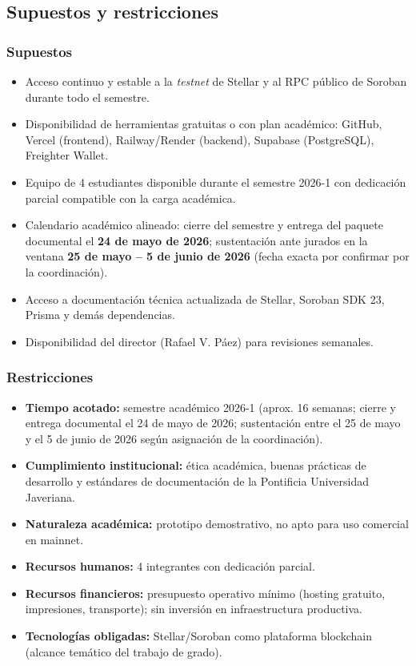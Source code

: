 \documentclass[12pt,oneside]{report}
\begin{document}
    \subsection{Supuestos y restricciones}
    \label{subsec:supuestos-restricciones}

      \subsubsection*{Supuestos}
      \begin{itemize}
        \item Acceso continuo y estable a la \textit{testnet} de Stellar y al RPC público de Soroban durante todo el semestre.
        \item Disponibilidad de herramientas gratuitas o con plan académico: GitHub, Vercel (frontend), Railway/Render (backend), Supabase (PostgreSQL), Freighter Wallet.
        \item Equipo de 4 estudiantes disponible durante el semestre 2026-1 con dedicación parcial compatible con la carga académica.
        \item Calendario académico alineado: cierre del semestre y entrega del paquete documental el \textbf{24 de mayo de 2026}; sustentación ante jurados en la ventana \textbf{25 de mayo -- 5 de junio de 2026} (fecha exacta por confirmar por la coordinación).
        \item Acceso a documentación técnica actualizada de Stellar, Soroban SDK 23, Prisma y demás dependencias.
        \item Disponibilidad del director (Rafael V. Páez) para revisiones semanales.
      \end{itemize}

      \subsubsection*{Restricciones}
      \begin{itemize}
        \item \textbf{Tiempo acotado:} semestre académico 2026-1 (aprox. 16 semanas; cierre y entrega documental el 24 de mayo de 2026; sustentación entre el 25 de mayo y el 5 de junio de 2026 según asignación de la coordinación).
        \item \textbf{Cumplimiento institucional:} ética académica, buenas prácticas de desarrollo y estándares de documentación de la Pontificia Universidad Javeriana.
        \item \textbf{Naturaleza académica:} prototipo demostrativo, no apto para uso comercial en mainnet.
        \item \textbf{Recursos humanos:} 4 integrantes con dedicación parcial.
        \item \textbf{Recursos financieros:} presupuesto operativo mínimo (hosting gratuito, impresiones, transporte); sin inversión en infraestructura productiva.
        \item \textbf{Tecnologías obligadas:} Stellar/Soroban como plataforma blockchain (alcance temático del trabajo de grado).
      \end{itemize}
\end{document}
